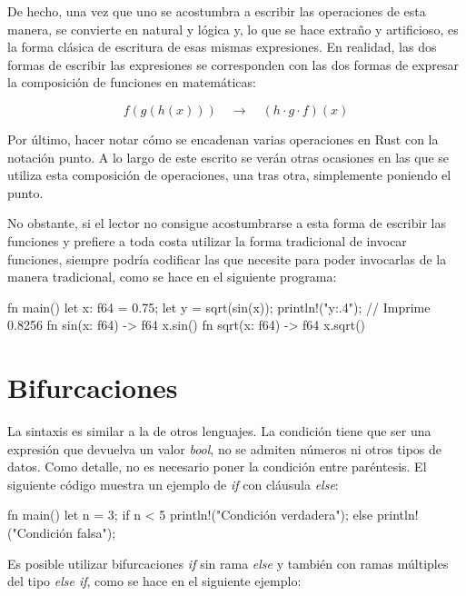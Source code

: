 De hecho, una vez que uno se acostumbra a escribir las operaciones de esta manera, se convierte en natural y lógica y, lo que se hace extraño y artificioso, es la forma clásica de escritura de esas mismas expresiones. En realidad, las dos formas de escribir las expresiones se corresponden con las dos formas de expresar la composición de funciones en matemáticas:

\[f(g(h(x)))  \quad \rightarrow \quad (h \cdot g \cdot f) (x) \]

Por último, hacer notar cómo se encadenan varias operaciones en Rust con la notación punto. A lo largo de este escrito se verán otras ocasiones en las que se utiliza esta composición de operaciones, una tras otra, simplemente poniendo el punto.

No obstante, si el lector no consigue acostumbrarse a esta forma de escribir las funciones y prefiere a toda costa utilizar la forma tradicional de invocar funciones, siempre podría codificar las que necesite para poder invocarlas de la manera tradicional, como se hace en el siguiente programa:

\vspace{0.7em}
\begin{Codigo}
fn main() {
   let x: f64 = 0.75;
   let y = sqrt(sin(x));
   println!("{y:.4}"); // Imprime 0.8256
}
fn sin(x: f64) -> f64 {
   x.sin()
}
fn sqrt(x: f64) -> f64 {
   x.sqrt()
}
\end{Codigo}


\section{Bifurcaciones}
\label{sec_bifurcaciones}

La sintaxis es similar a la de otros lenguajes. La condición tiene que ser una expresión que devuelva un valor \textit{bool}, no se admiten números ni otros tipos de datos. Como detalle, no es necesario poner la condición entre paréntesis. El siguiente código muestra un ejemplo de \textit{if} con cláusula \textit{else}:

\vspace{0.7em}
\begin{Codigo}
fn main() {
   let n = 3;
   if n < 5 {
      println!("Condición verdadera");
   } else {
      println!("Condición falsa");
   }
}
\end{Codigo}

Es posible utilizar bifurcaciones \textit{if} sin rama \textit{else} y también con ramas múltiples del tipo \textit{else if}, como se hace en el siguiente ejemplo:

